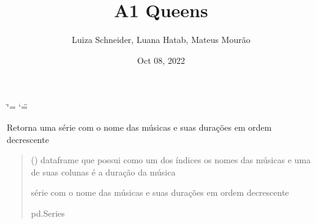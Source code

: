 \documentclass[letterpaper,10pt,english]{sphinxmanual}
\title{A1 \sphinxhyphen{} Queens}
\date{Oct 08, 2022}
\author{Luiza Schneider, Luana Hatab, Mateus Mourão}
\begin{document}
\ifdefined\shorthandoff
  \ifnum\catcode`\=\string=\active\shorthandoff{=}\fi
  \ifnum\catcode`\"=\active{}\fi
\fi

\pagestyle{empty}
\sphinxmaketitle
\pagestyle{plain}
\sphinxtableofcontents
\pagestyle{normal}
\label{\detokenize{index::doc}}


\begin{fulllineitems}
\label{\detokenize{index:functions.duracao_album}}
\pysigstartsignatures
{}
\pysigstopsignatures
\sphinxAtStartPar
Retorna uma série com o nome das músicas e suas durações em ordem decrescente
\begin{quote}\begin{description}
\sphinxAtStartPar
{} () \textendash{} dataframe que possui como um dos índices os nomes das músicas e uma de suas colunas é a duração da música

\sphinxAtStartPar
série com o nome das músicas e suas durações em ordem decrescente

\sphinxAtStartPar
pd.Series

\end{description}\end{quote}

\end{fulllineitems}

\end{document}
